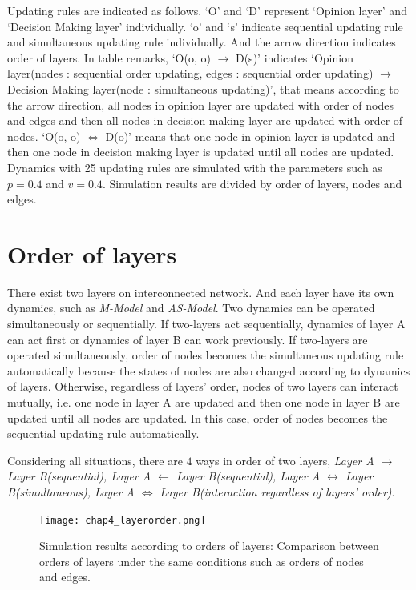Updating rules are indicated as follows. `O' and `D'  represent `Opinion layer' and `Decision Making layer' individually. `o' and `s' indicate sequential updating rule and simultaneous updating rule individually. And the arrow direction indicates order of layers. In table remarks, `O(o, o) $\to$ D(s)' indicates `Opinion layer(nodes : sequential order updating, edges : sequential order updating) $\to$ Decision Making layer(node : simultaneous updating)', that means according to the arrow direction, all nodes in opinion layer are updated with order of nodes and edges and then all nodes in decision making layer are updated with order of nodes. `O(o, o) $\Leftrightarrow$ D(o)' means that one node in opinion layer is updated and then one node in decision making layer is updated until all nodes are updated. Dynamics with 25 updating rules are simulated with the parameters such as $p=0.4$ and $v=0.4$. Simulation results are divided by order of layers, nodes and edges. \\

\section{Order of layers}
There exist two layers on interconnected network. And each layer have its own dynamics, such as \textit{M-Model} and \textit{AS-Model}. Two dynamics can be operated simultaneously or sequentially. If two-layers act sequentially, dynamics of layer A can act first or dynamics of layer B can work previously. If two-layers are operated simultaneously, order of nodes becomes the simultaneous updating rule automatically because the states of nodes are also changed according to dynamics of layers. Otherwise, regardless of layers' order, nodes of two layers can interact mutually, i.e. one node in layer A are updated and then one node in layer B are updated until all nodes are updated. In this case, order of nodes becomes the sequential updating rule automatically.

Considering all situations, there are $4$ ways in order of two layers, \textit{Layer A $\to$ Layer B(sequential), Layer A $\leftarrow$ Layer B(sequential), Layer A $\leftrightarrow$ Layer B(simultaneous), Layer A $\Leftrightarrow$ Layer B(interaction regardless of layers' order)}. 

\begin{figure}[!htb]
	\centering
	\texttt{[image: chap4\_layerorder.png]}
	\caption{Simulation results according to orders of layers: Comparison between orders of layers under the same conditions such as orders of nodes and edges.}
	\label{chap4_layerorder}
\end{figure}

